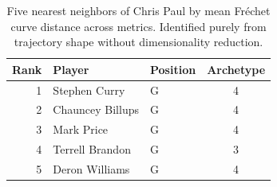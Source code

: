 \begin{table}[htbp]
  \centering\small
  \begin{tabular}{rllc}
    \toprule
    Rank & Player & Position & Archetype \\
    \midrule
    1 & Stephen Curry & G & 4 \\
    2 & Chauncey Billups & G & 4 \\
    3 & Mark Price & G & 4 \\
    4 & Terrell Brandon & G & 3 \\
    5 & Deron Williams & G & 4 \\
    \bottomrule
  \end{tabular}
  \caption{Five nearest neighbors of Chris Paul by mean Fr\'{e}chet curve distance across metrics. Identified purely from trajectory shape without dimensionality reduction.}
  \label{tab:Chris_Paul_frechet_curve_neighbors}
\end{table}

